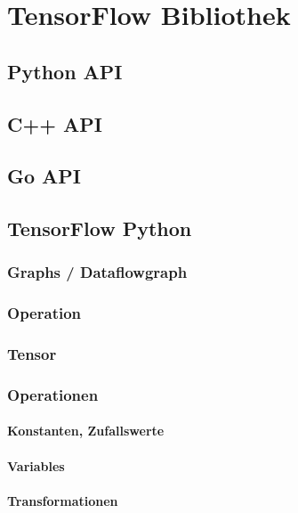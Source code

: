 \chapter{TensorFlow Bibliothek}
\label{cha:TensorFlow Bibliothek}

\section{Python API}

\section{C++ API}

\section{Go API}

\section{TensorFlow Python}

\subsection{Graphs / Dataflowgraph}

\subsection{Operation}

\subsection{Tensor}

\subsection{Operationen}

\subsubsection{Konstanten, Zufallswerte}

\subsubsection{Variables}

\subsubsection{Transformationen}

